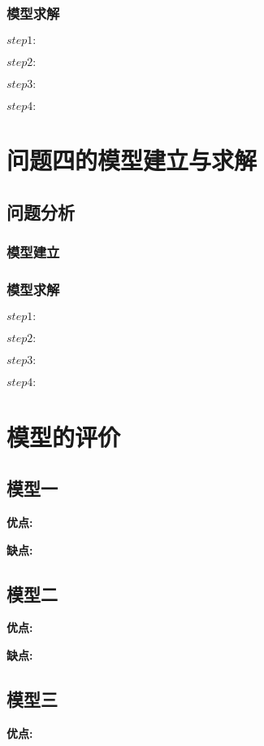 \documentclass[UTF8]{ctexart}
\begin{document}
\subsubsection{模型求解}

\textbf{$step1:$}

\textbf{$step2:$}

\textbf{$step3:$}

\textbf{$step4:$}


\section{问题四的模型建立与求解}
\subsection{问题分析}



\subsubsection{模型建立}



\subsubsection{模型求解}

\textbf{$step1:$}

\textbf{$step2:$}

\textbf{$step3:$}

\textbf{$step4:$}

\section{模型的评价}
\subsection{模型一}
\textbf{优点:}


\textbf{缺点:}

\subsection{模型二}
\textbf{优点:}


\textbf{缺点:}

\subsection{模型三}
\textbf{优点:}
\end{document}
